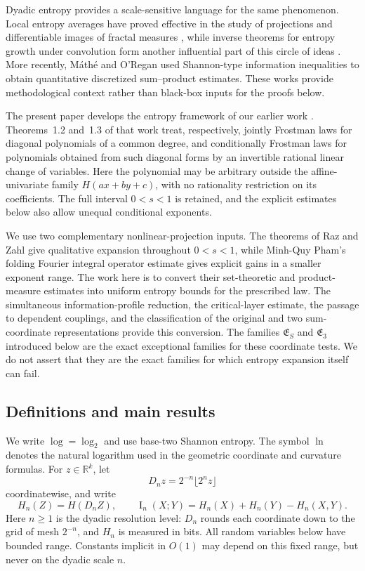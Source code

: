 \documentclass[11pt]{article}
\begin{document}
Dyadic entropy provides a scale-sensitive language for the same
phenomenon.  Local entropy averages have proved effective in the
study of projections and differentiable images of fractal measures
\cite{HochmanShmerkin}, while inverse theorems for entropy growth
under convolution form another influential part of this circle of
ideas \cite{HochmanEntropy}.  More recently, M\'ath\'e and O'Regan
\cite{MatheORegan} used Shannon-type information inequalities to
obtain quantitative discretized sum--product estimates.  These works
provide methodological context rather than black-box inputs for the
proofs below.

The present paper develops the entropy framework of our earlier work
\cite{IPQSX}.  Theorems~1.2 and~1.3 of that work treat, respectively,
jointly Frostman laws for diagonal polynomials of a common degree,
and conditionally Frostman laws for polynomials obtained from such
diagonal forms by an invertible rational linear change of variables.
Here the polynomial may be arbitrary outside the affine-univariate
family \(H(ax+by+c)\), with no rationality restriction on its
coefficients.  The full interval \(0<s<1\) is retained, and the
explicit estimates below also allow unequal conditional exponents.

We use two complementary nonlinear-projection inputs.  The theorems
of Raz and Zahl \cite{RZ} give qualitative expansion throughout
\(0<s<1\), while Minh-Quy Pham's folding Fourier integral operator
estimate \cite{PhamFIO} gives explicit gains in a smaller exponent
range.  The work here is to convert their set-theoretic and
product-measure estimates into uniform entropy bounds for the
prescribed law.  The simultaneous information-profile reduction, the
critical-layer estimate, the passage to dependent couplings, and the
classification of the original and two sum-coordinate
representations provide this conversion.  The families
\(\mathfrak E_S\) and \(\mathfrak E_3\) introduced below are the exact
exceptional families for these coordinate tests.  We do not assert
that they are the exact families for which entropy expansion itself
can fail.

\subsection{Definitions and main results}

We write \(\log=\log_2\) and use base-two Shannon entropy.
The symbol \(\ln\) denotes the natural logarithm used in the
geometric coordinate and curvature formulas.  For
\(z\in\mathbb R^k\), let
\[
 D_nz=2^{-n}\lfloor 2^nz\rfloor
\]
coordinatewise, and write
\[
 H_n(Z)=H(D_nZ),\qquad
 \operatorname{I}_n(X;Y)=H_n(X)+H_n(Y)-H_n(X,Y).
\]
Here \(n\ge1\) is the dyadic resolution level: \(D_n\) rounds
each coordinate down to the grid of mesh \(2^{-n}\), and \(H_n\)
is measured in bits.
All random variables below have bounded range.  Constants implicit in
\(O(1)\) may depend on this fixed range, but never on the dyadic scale
\(n\).
\end{document}
